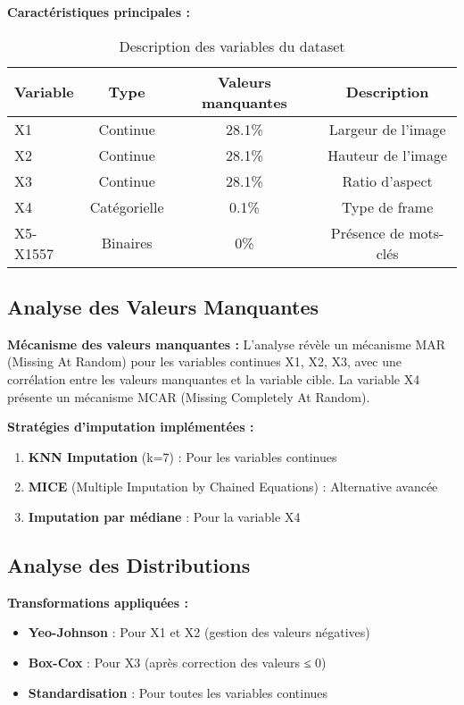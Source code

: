 \documentclass[12pt,a4paper]{article}
\begin{document}
\textbf{Caractéristiques principales :}
\begin{table}[H]
\centering
\begin{tabular}{|l|c|c|c|}
\hline
\textbf{Variable} & \textbf{Type} & \textbf{Valeurs manquantes} & \textbf{Description} \\
\hline
X1 & Continue & 28.1\% & Largeur de l'image \\
X2 & Continue & 28.1\% & Hauteur de l'image \\
X3 & Continue & 28.1\% & Ratio d'aspect \\
X4 & Catégorielle & 0.1\% & Type de frame \\
X5-X1557 & Binaires & 0\% & Présence de mots-clés \\
\hline
\end{tabular}
\caption{Description des variables du dataset}
\end{table}

\subsection{Analyse des Valeurs Manquantes}

\textbf{Mécanisme des valeurs manquantes :}
L'analyse révèle un mécanisme MAR (Missing At Random) pour les variables continues X1, X2, X3, avec une corrélation entre les valeurs manquantes et la variable cible. La variable X4 présente un mécanisme MCAR (Missing Completely At Random).

\textbf{Stratégies d'imputation implémentées :}
\begin{enumerate}
    \item \textbf{KNN Imputation} (k=7) : Pour les variables continues
    \item \textbf{MICE} (Multiple Imputation by Chained Equations) : Alternative avancée
    \item \textbf{Imputation par médiane} : Pour la variable X4
\end{enumerate}

\subsection{Analyse des Distributions}

\textbf{Transformations appliquées :}
\begin{itemize}
    \item \textbf{Yeo-Johnson} : Pour X1 et X2 (gestion des valeurs négatives)
    \item \textbf{Box-Cox} : Pour X3 (après correction des valeurs ≤ 0)
    \item \textbf{Standardisation} : Pour toutes les variables continues
\end{itemize}
\end{document}
